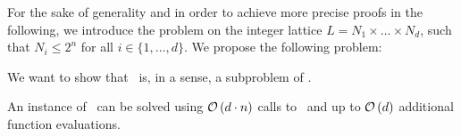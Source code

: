 For the sake of generality and in order to achieve more precise proofs in the following, we introduce the problem on the integer lattice $L = N_1 \times \dots \times N_d$, such that $N_i \leq 2^n$ for all $i \in \{1, \dots, d\}$. We propose the following problem:

We want to show that \Tarskistar\ is, in a sense, a subproblem of \Tarski.
\begin{claim}
	An instance of \Tarski\ can be solved using $\mathcal{O}\left(d\cdot n\right)$ calls to \Tarskistar\ and up to $\mathcal{O}\left(d\right)$ additional function evaluations.
\end{claim}
